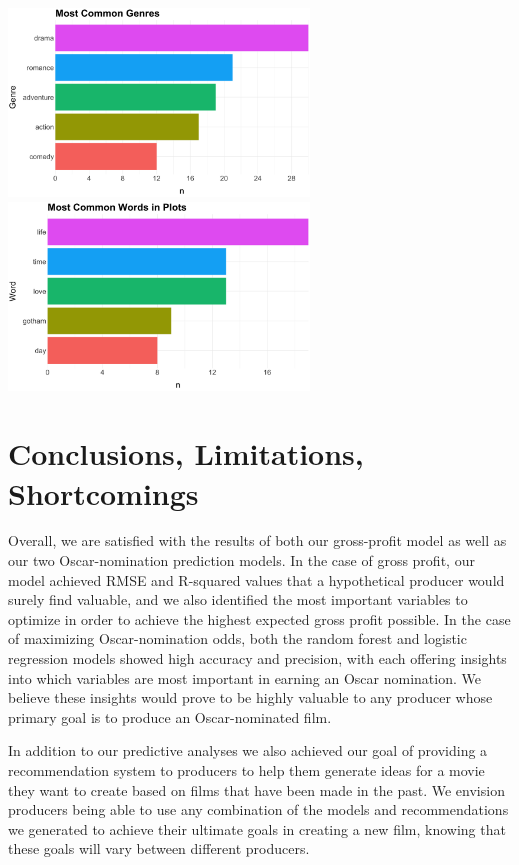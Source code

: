 \documentclass[10pt]{article}
\begin{document}
\begin{center}
\includegraphics[width=8cm]{_assets/_assets_knn/forrest_gump_common_genres.png}
\hspace{1cm}
\includegraphics[width=8cm]{_assets/_assets_knn/forrest_gump_common_words.png}

\end{center}

\section{Conclusions, Limitations, Shortcomings}
Overall, we are satisfied with the results of both our gross-profit model as well as our two Oscar-nomination prediction models. In the case of gross profit, our model achieved RMSE and R-squared values that a hypothetical producer would surely find valuable, and we also identified the most important variables to optimize in order to achieve the highest expected gross profit possible. In the case of maximizing Oscar-nomination odds, both the random forest and logistic regression models showed high accuracy and precision, with each offering insights into which variables are most important in earning an Oscar nomination. We believe these insights would prove to be highly valuable to any producer whose primary goal is to produce an Oscar-nominated film.

In addition to our predictive analyses we also achieved our goal of providing a recommendation system to producers to help them generate ideas for a movie they want to create based on films that have been made in the past. We envision producers being able to use any combination of the models and recommendations we generated to achieve their ultimate goals in creating a new film, knowing that these goals will vary between different producers.
\end{document}
